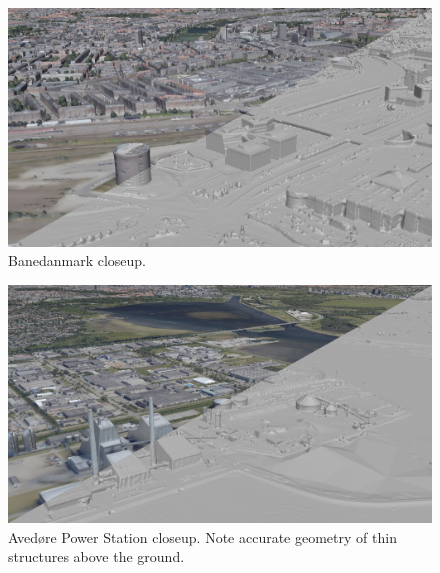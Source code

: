 \documentclass[10pt,letterpaper]{article}
\begin{document}
\begin{figure}
    \centering
    \capstart
    \begin{minipage}[b]{1.0\linewidth}
        \includegraphics[width=\textwidth]{images/copenhagen/results/closeups/diag/banedanmark_diag.jpg}
    \end{minipage}
    \caption{Banedanmark closeup.}
    \label{fig:closeup_banedanmark}
\end{figure}

\begin{figure}
    \centering
    \capstart
    \begin{minipage}[b]{1.0\linewidth}
        \includegraphics[width=\textwidth]{images/copenhagen/results/closeups/diag/avedore_power_station_diag.jpg}
    \end{minipage}
    \caption{Aved{\o}re Power Station closeup. Note accurate geometry of thin structures above the ground.}
    \label{fig:closeup_power_station}
\end{figure}
\end{document}
